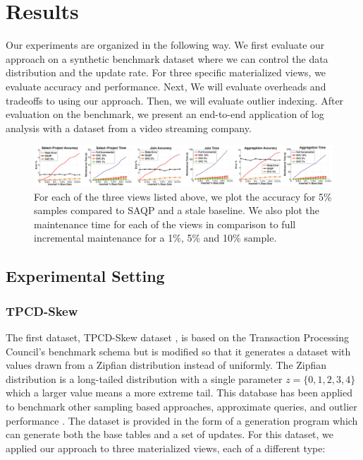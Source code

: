 \section{Results}
\label{exp}
Our experiments are organized in the following way.
We first evaluate our approach on a synthetic benchmark dataset where we can control the data distribution and the update rate.
For three specific materialized views, we evaluate accuracy and performance.
Next, We will evaluate overheads and tradeoffs to using our approach.
Then, we will evaluate outlier indexing.
After evaluation on the benchmark, we present an end-to-end application of log analysis with a dataset from a video streaming company.

\begin{figure}[ht!]
\label{exp2update}
\hspace{-5.5em}
 \includegraphics[scale=0.19]{exp/exp2-full.eps}
 \caption{For each of the three views listed above, we plot the accuracy for 5\% samples compared to SAQP and a stale baseline. We also plot the maintenance time for each of the views in comparison to full incremental maintenance for a 1\%, 5\% and 10\% sample.}
\end{figure}

\subsection{Experimental Setting}
\subsubsection{TPCD-Skew}
The first dataset, TPCD-Skew dataset \cite{tpcdskew}, is based on the Transaction Processing Council's benchmark
schema but is modified so that it generates a dataset with values drawn from a Zipfian distribution instead of uniformly.
The Zipfian distribution \cite{mitzenmacher2004brief} is a long-tailed distribution with a single parameter $z=\{0,1,2,3,4\}$ which a larger
value means a more extreme tail.
This database has been applied to benchmark other sampling based approaches, approximate queries, and outlier performance \cite{chaudhuri2001overcoming, agrawal2005database}.
The dataset is provided in the form of a generation program which can generate both the base tables and a set of updates.
For this dataset, we applied our approach to three materialized views, each of a different type:
\vspace{0.5em}

